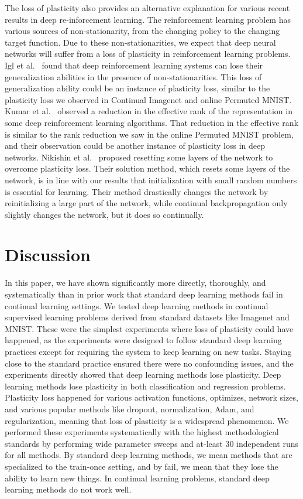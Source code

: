 \documentclass[review, number,3p]{elsarticle}
\begin{document}
The loss of plasticity also provides an alternative explanation for various recent results in deep re-inforcement learning. 
The reinforcement learning problem has various sources of non-stationarity, from the changing policy to the changing target function. 
Due to these non-stationarities, we expect that deep neural networks will suffer from a loss of plasticity in reinforcement learning problems. 
Igl et al.\ \cite{transient2021} found that deep reinforcement learning systems can lose their generalization abilities in the presence of non-stationarities. 
This loss of generalization ability could be an instance of plasticity loss, similar to the plasticity loss we observed in Continual Imagenet and online Permuted MNIST.
Kumar et al.\ \cite{kumar2021implicit} observed a reduction in the effective rank of the representation in some deep reinforcement learning algorithms.
That reduction in the effective rank is similar to the rank reduction we saw in the online Permuted MNIST problem, and their observation could be another instance of plasticity loss in deep networks.
Nikishin et al.\ \cite{primacy2022} proposed resetting some layers of the network to overcome plasticity loss. 
Their solution method, which resets some layers of the network, is in line with our results that initialization with small random numbers is essential for learning. 
Their method drastically changes the network by reinitializing a large part of the network, while continual backpropagation only slightly changes the network, but it does so continually.


\section{Discussion}

In this paper, we have shown significantly more directly, thoroughly, and systematically than in prior work that standard deep learning methods fail in continual learning settings.
We tested deep learning methods in continual supervised learning problems derived from standard datasets like Imagenet and MNIST.
These were the simplest experiments where loss of plasticity could have happened, as the experiments were designed to follow standard deep learning practices except for requiring the system to keep learning on new tasks.
Staying close to the standard practice ensured there were no confounding issues, and the experiments directly showed that deep learning methods lose plasticity.
Deep learning methods lose plasticity in both classification and regression problems. 
Plasticity loss happened for various activation functions, optimizes, network sizes, and various popular methods like dropout, normalization, Adam, and regularization, meaning that loss of plasticity is a widespread phenomenon.
We performed these experiments systematically with the highest methodological standards by performing wide parameter sweeps and at-least 30 independent runs for all methods.
By standard deep learning methods, we mean methods that are specialized to the train-once setting, and by fail, we mean that they lose the ability to learn new things.
In continual learning problems, standard deep learning methods do not work well.
\end{document}
